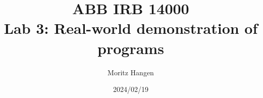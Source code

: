 \title{ABB IRB 14000 \\ Lab 3: Real-world demonstration of programs}
\author{Moritz Hangen}
\date{2024/02/19}
\maketitle